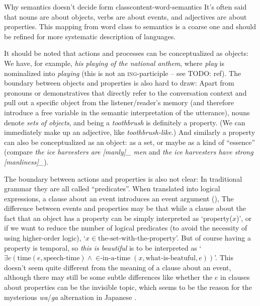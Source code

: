 \documentclass[UTF8, a4paper, oneside, scheme=plain]{ctexrep}
\newcommand{\corpus}[1]{\emph{#1}}
\newcommand{\corpuscat}[1]{\textsc{#1}}
\newcommand{\translate}[1]{`#1'}
\begin{document}
\begin{theorybox}{Why semantics doesn't decide form class}{content-word-semantics}
    It's often said that nouns are about objects, 
    verbs are about events,
    and adjectives are about properties.
    This mapping from word class to semantics is a coarse one 
    and should be refined for more systematic description of languages.

    It should be noted that actions and processes can be conceptualized as objects:
    We have, for example, \corpus{his playing of the national anthem},
    where \corpus{play} is nominalized into \corpus{playing}
    (this is not an \corpuscat{ing}-participle -- see TODO: ref).
    The boundary between objects and properties is also hard to draw:
    Apart from pronouns or demonstratives 
    that directly refer to the conversation context 
    and pull out a specific object from the listener/reader's memory
    (and therefore introduce a free variable in the semantic interpretation of the utterance),
    nouns denote \emph{sets of objects},
    and being a \corpus{toothbrush} is definitely a property.
    (We can immediately make up an adjective, like \corpus{toothbrush-like}.)
    And similarly a property can also be conceptualized as an object: 
    as a set, or maybe as a kind of ``essence''
    (compare \corpus{the ice harvesters are [manly]_{} men}
    and \corpus{the ice harvesters have strong [manliness]_{\text{object?}}}).

    The boundary between actions and properties is also not clear:
    In traditional grammar they are all called ``predicates''.
    When translated into logical expressions,
    a clause about an event introduces an event argument (),
    The difference between events and properties may be that
    while a clause about the fact that an object has a property 
    can be simply interpreted as \translate{property($x$)},
    or if we want to reduce the number of logical predicates 
    (to avoid the necessity of using higher-order logic),
    \translate{$x \in \text{the-set-with-the-property}$}.
    But of course having a property is temporal,
    so \corpus{this is beautiful} is to be interpreted as 
    \translate{$\exists e (\text{time}(e, \text{speech-time}) \land 
    \text{$\in$-in-a-time}(x, \text{what-is-beatuful}, e) )$}.
    This doesn't seem quite different from the meaning of a clause about an event,
    although there may still be some subtle differences like 
    whether the $e$ in clauses about properties can be the invisible topic, 
    which seems to be the reason for the mysterious \corpus{wa}/\corpus{ga} alternation in Japanese
    \citep{heycock2008}.


\end{theorybox}
\end{document}
